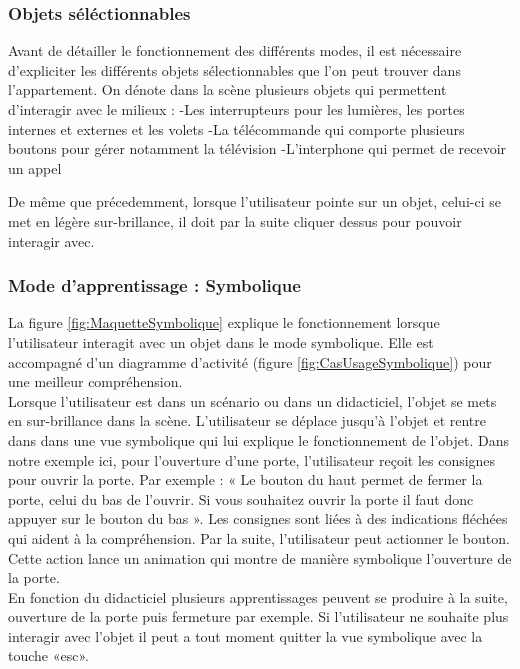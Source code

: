 \subsubsection{Objets séléctionnables}

Avant de détailler le fonctionnement des différents modes, il est nécessaire d'expliciter les différents objets sélectionnables que l'on peut trouver dans l'appartement. On dénote dans la scène plusieurs objets qui permettent d'interagir avec le milieux :
-Les interrupteurs pour les lumières, les portes internes et externes et les volets
-La télécommande qui comporte plusieurs boutons pour gérer notamment la télévision
-L'interphone qui permet de recevoir un appel

De même que précedemment, lorsque l'utilisateur pointe sur un objet, celui-ci se met en légère sur-brillance, il doit par la suite cliquer dessus pour pouvoir interagir avec. %


\subsubsection{Mode d'apprentissage : Symbolique}

La figure \ref{fig:MaquetteSymbolique} explique le fonctionnement lorsque l'utilisateur interagit avec un objet dans le mode symbolique. Elle est accompagné d'un diagramme d'activité (figure \ref{fig:CasUsageSymbolique}) pour une meilleur compréhension.
\\
Lorsque l'utilisateur est dans un scénario ou dans un didacticiel, l'objet se mets en sur-brillance dans la scène. L'utilisateur se déplace jusqu'à l'objet et rentre dans dans une vue symbolique qui lui explique le fonctionnement de l'objet. Dans notre exemple ici, pour l'ouverture d'une porte, l'utilisateur reçoit les consignes pour ouvrir la porte. Par exemple : « Le bouton du haut permet de fermer la porte, celui du bas de l'ouvrir. Si vous souhaitez ouvrir la porte il faut donc appuyer sur le bouton du bas ». Les consignes sont liées à des indications fléchées qui aident à la compréhension. Par la suite, l'utilisateur peut actionner le bouton. Cette action lance un animation qui montre de manière symbolique l'ouverture de la porte. 
\\
En fonction du didacticiel plusieurs apprentissages peuvent se produire à la suite, ouverture de la porte puis fermeture par exemple. Si l'utilisateur ne souhaite plus interagir avec l'objet il peut a tout moment quitter la vue symbolique avec la touche «esc». 

